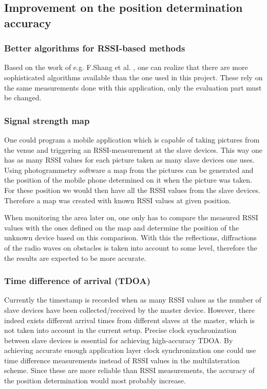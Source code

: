 \documentclass[11pt,a4paper]{article}
\numberwithin{equation}{section}   %
\numberwithin{figure}{section}     %
\numberwithin{table}{section}      %
\begin{document}
\subsection{Improvement on the position determination accuracy}

\subsubsection{Better algorithms for RSSI-based methods}

Based on the work of e.g. F.Shang et al. \cite{Shang}, one can realize that there are more sophisticated algorithms available than the one used in this project. These rely on the same measurements done with this application, only the evaluation part must be changed.

\subsubsection{Signal strength map}

One could program a mobile application which is capable of taking pictures from the venue and triggering an RSSI-measurement at the slave devices. This way one has as many RSSI values for each picture taken as many slave devices one uses. Using photogrammetry software a map from the pictures can be generated and the position of the mobile phone determined on it when the picture was taken. For these position we would then have all the RSSI values from the slave devices. Therefore a map was created with known RSSI values at given position.

When monitoring the area later on, one only has to compare the measured RSSI values with the ones defined on the map and determine the position of the unknown device based on this comparison. With this the reflections, diffractions of the radio waves on obstacles is taken into account to some level, therefore the the results are expected to be more accurate.

\subsubsection{Time difference of arrival (TDOA)}

Currently the timestamp is recorded when as many RSSI values as the number of slave devices have been collected/received by the master device. However, there indeed exists different arrival times from different slaves at the master, which is not taken into account in the current setup. Precise clock synchronization between slave devices is essential for achieving high-accuracy TDOA. By achieving accurate enough application layer clock synchronization one could use time difference measurements instead of RSSI values in the multilateration scheme. Since these are more reliable than RSSI measurements, the accuracy of the position determination would most probably increase.
\end{document}
